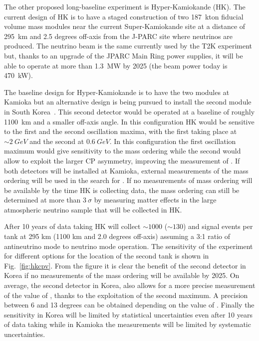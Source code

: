 The other proposed long-baseline experiment is Hyper-Kamiokande (HK). The current design of HK is to have a staged construction of two 187~kton fiducial volume mass modules near the current Super-Kamiokande site at a distance of 295~km and 2.5 degrees off-axis from the J-PARC site where neutrinos are produced. The neutrino beam is the same currently used by the T2K experiment but, thanks to an upgrade of the JPARC Main Ring power supplies, it will be able to operate at more than 1.3~MW  by 2025 (the beam power today is 470~kW).

The baseline design  for Hyper-Kamiokande is to have the two modules at Kamioka but an alternative design is being pursued to install the second module in South Korea~\cite{Abe:2016ero}. This second detector would be operated at a baseline of roughly 1100~km and a smaller off-axis angle. In this configuration HK would be sensitive to the first and the second oscillation maxima, with the first taking place at $\sim2~GeV$ and the second at $0.6~GeV$. In this configuration the first oscillation maximum would give sensitivity to the mass ordering while the second would allow to exploit the larger CP asymmetry, improving the measurement of \dcp.  If both detectors will be installed at Kamioka, external measurements of the mass ordering will be used in the search for \dcp. If no measurements of mass ordering will be available by the time HK is collecting data, the mass ordering can still be determined at more than $3~\sigma$ by measuring matter effects in the large atmospheric neutrino sample that will be collected in HK.    

After 10 years of data taking  HK will collect $\sim1000$ ($\sim130$) \nue and \nueb signal events per tank at 295 km (1100 km and 2.0 degrees off-axis) assuming a 3:1 ratio of antineutrino mode to neutrino mode operation. The sensitivity of the experiment for different options for the location of the second tank is shown in Fig.~\ref{fig:hkcpv}. From the figure it is clear the benefit of the second detector in Korea if no measurements of the mass ordering will be available by 2025. On average, the second detector in Korea, also allows for a more precise measurement of the value of \dcp, thanks to the exploitation of the second maximum. A precision between 6 and 13 degrees can be obtained depending on the value of \dcp. Finally the sensitivity in Korea will be limited by statistical uncertainties even after 10 years of data taking while in Kamioka the measurements will be limited by systematic uncertainties.

